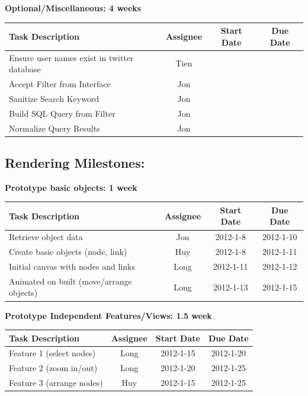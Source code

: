 \documentclass[12pt, letterpaper]{article}
\begin{document}
  \begin{center}
		{\bf Optional/Miscellaneous: 4 weeks}
    \begin{tabular}{| p{8.3cm} || c | c | c | }
      \hline
      Task Description & Assignee & Start Date & Due Date \\
      \hline
			Ensure user names exist in twitter database & Tien & & \\
	    Accept Filter from Interface & Jon & & \\
	    Sanitize Search Keyword & Jon & & \\
	    Build SQL Query from Filter & Jon & & \\
      Normalize Query Results & Jon & & \\
      \hline
    \end{tabular}
  \end{center}
  
\subsection{Rendering Milestones:}

  \begin{center}
		{\bf Prototype basic objects: 1 week}
    \begin{tabular}{| p{8.3cm} || c | c | c | }
      \hline
      Task Description & Assignee & Start Date & Due Date \\
      \hline
			Retrieve object data & Jon & 2012-1-8 & 2012-1-10 \\
	    Create basic objects (node, link)& Huy & 2012-1-8 & 2012-1-11 \\
			Initial canvas with nodes and links & Long & 2012-1-11 & 2012-1-12 \\
	    Animated on built (move/arrange objects) & Long & 2012-1-13 & 2012-1-15 \\
      \hline
    \end{tabular}
  \end{center}

\begin{center}
		{\bf Prototype Independent Features/Views: 1.5 week}
    \begin{tabular}{| p{8.3cm} || c | c | c | }
      \hline
      Task Description & Assignee & Start Date & Due Date \\
      \hline
	    Feature 1 (select nodes) & Long & 2012-1-15 & 2012-1-20 \\
	    Feature 2 (zoom in/out)  & Long & 2012-1-20 & 2012-1-25 \\
	    Feature 3 (arrange nodes)  & Huy & 2012-1-15 & 2012-1-25 \\
      \hline
    \end{tabular}
  \end{center}
\end{document}
